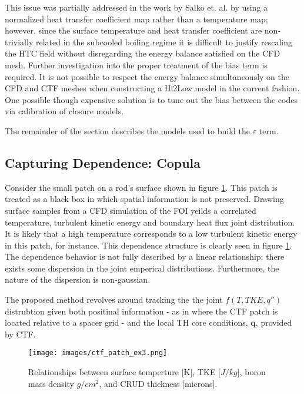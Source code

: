This issue was partially addressed in the work by Salko et. al. by using a normalized heat transfer coefficient map rather than a temperature map; however, since the surface temperature and heat transfer coefficient are non-trivially related in the subcooled boiling regime it is difficult to justify rescaling the HTC field without disregarding the energy balance satisfied on the CFD mesh.  Further investigation into the proper treatment of the bias term is required.  It is not possible to respect the energy balance simultaneously on the CFD and CTF meshes when constructing a Hi2Low model in the current fashion.  One possible though expensive solution is to tune out the bias between the codes via calibration of closure models.

The remainder of the section describes the models used to build the $\varepsilon$ term.

\subsection{Capturing Dependence: Copula}

Consider the small patch on a rod's surface shown in figure \ref{fig:ctf_patch_dist}.  This patch is treated as a black box in which spatial information is not preserved. Drawing surface samples from a CFD simulation of the FOI yeilds a correlated temperature, turbulent kinetic energy and boundary heat flux joint distribution.  It is likely that a high temperature corresponds to a low turbulent kinetic energy in this patch, for instance.  This dependence structure is clearly seen in figure \ref{fig:ctf_patch_dist}.  The dependence behavior is not fully described by a linear relationship; there exists some dispersion in the joint emperical distributions.  Furthermore, the nature of the dispersion is non-gaussian.  

The proposed method revolves around tracking the the joint $f(T, TKE, q'')$ distrubtion given both positinal information - as in where the CTF patch is located relative to a spacer grid - and the local TH core conditions, $\mathbf q$, provided by CTF. \\

\begin{figure}[!htbp]
\centering
\texttt{[image: images/ctf\_patch\_ex3.png]}
\caption{Relationships between surface temperture [K], TKE [$J/kg$], boron mass density $g/cm^2$, and CRUD thickness [microns].}
\label{fig:ctf_patch_dist}
\end{figure}


